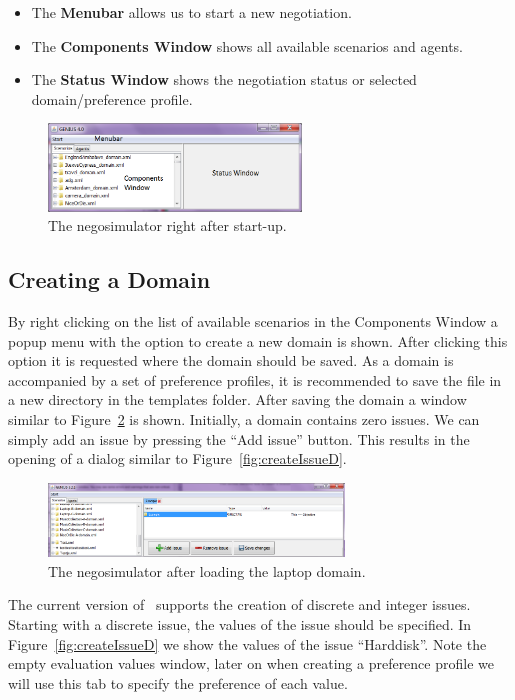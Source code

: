 \documentclass[]{article}
\begin{document}
\begin{itemize}
	\item The \textbf{Menubar} allows us to start a new negotiation.
	\item The \textbf{Components Window} shows all available scenarios and agents.
	\item The \textbf{Status Window} shows the negotiation status or selected domain/preference profile.
\end{itemize}

\begin{figure}[htb]
	\centering
	\includegraphics[width=0.6\textwidth]{media/image6.png}
\caption{The negosimulator right after start-up.}\label{Fig:negosimulator start}
\end{figure}

\subsection{Creating a Domain}
By right clicking on the list of available scenarios in the Components Window a popup menu with the option to create a new domain is shown. After clicking this option it is requested where the domain should be saved. As a domain is accompanied by a set of preference profiles, it is recommended to save the file in a new directory in the templates folder. After saving the domain a window similar to Figure~\ref{Fig:newdomain} is shown. Initially, a domain contains zero issues. We can simply add an issue by pressing the ``Add issue'' button. This results in the opening of a dialog similar to Figure~\ref{fig:createIssueD}.

\begin{figure}[htb]
	\centering
	\includegraphics[width=0.7\textwidth]{media/image7.png}
\caption{The negosimulator after loading the laptop domain.}\label{Fig:newdomain}
\end{figure}

The current version of \Genius~supports the creation of discrete and integer issues. Starting with a discrete issue, the values of the issue should be specified. In Figure~\ref{fig:createIssueD} we show the values of the issue ``Harddisk''. Note the empty evaluation values window, later on when creating a preference profile we will use this tab to specify the preference of each value.
\end{document}
